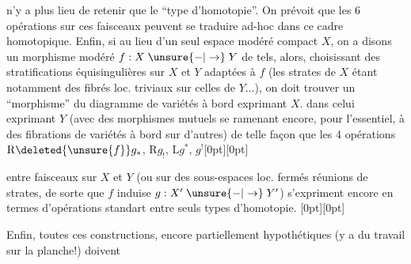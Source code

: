 %
n'y a plus lieu de retenir que le ``type d'homotopie''. On prévoit que les 6 opérations sur ces
faisceaux peuvent se traduire ad-hoc dans
ce cadre homotopique. Enfin, si au lieu d'un
seul espace modéré compact $X$, on a disons
un morphisme modéré $f:X\mathrel{\unsure{-|\to}}Y$ de tels,
alors, choisissant des stratifications équisingulières
sur $X$ et $Y$ adaptées à $f$ (les strates de $X$
étant notamment des fibrés loc. triviaux
sur celles de $Y\ldots$), on doit trouver un
``morphisme'' du diagramme de variétés à
bord exprimant $X$. dans celui exprimant $Y$
(avec des morphismes mutuels se ramenant 
encore, pour l'essentiel, à des fibrations de
variétés à bord sur d'autres) de telle façon
que les 4 opérations $\mathrm{R}\deleted{\unsure{f}}g_*$, $\mathrm{R}g_!$, $\mathrm{L}g^*$, $g^!$\raisebox{-1.5ex}[0pt][0pt]{\parbox{0pt}{\figure{\begin{tikzpicture}[overlay]\draw[line width=.25pt] (-.75em,.15em)--(-.65em,-.15em);\end{tikzpicture}}}} entre
faisceaux  sur $X$ et $Y$ (ou sur des sous-espaces
loc. fermés  réunions de strates, de sorte que
$f$ induise $g:X'\mathrel{\unsure{-|\to}}Y'$) s'expriment encore
en termes d'opérations standart entre seuls
types d'homotopie. \raisebox{2.1ex}[0pt][0pt]{\parbox{0pt}{}}Enfin, toutes ces
constructions, encore partiellement hypothétiques
(y a du travail  sur la planche!) doivent
